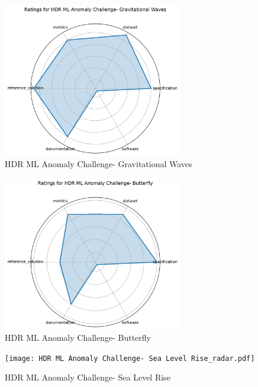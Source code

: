 \documentclass{article}
\begin{document}
\begin{figure}[h!]
  \centering
  \includegraphics[width=0.7\textwidth]{HDR ML Anomaly Challenge- Gravitational Waves_radar.pdf}
  \caption{HDR ML Anomaly Challenge- Gravitational Waves}
\end{figure}

\begin{figure}[h!]
  \centering
  \includegraphics[width=0.7\textwidth]{HDR ML Anomaly Challenge- Butterfly_radar.pdf}
  \caption{HDR ML Anomaly Challenge- Butterfly}
\end{figure}

\begin{figure}[h!]
  \centering
  \texttt{[image: HDR ML Anomaly Challenge- Sea Level Rise\_radar.pdf]}
  \caption{HDR ML Anomaly Challenge- Sea Level Rise}
\end{figure}
\end{document}
